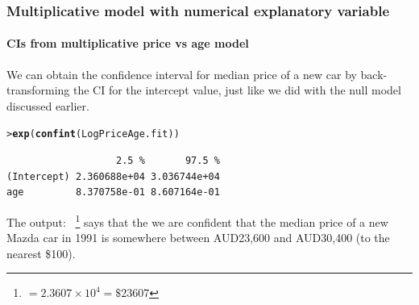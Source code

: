 \documentclass{beamer}\usepackage[]{graphicx}\usepackage[]{xcolor}
\makeatletter
\newcommand{\hlstd}[1]{\textcolor[rgb]{0.345,0.345,0.345}{#1}}%
\newcommand{\hlkwd}[1]{\textcolor[rgb]{0.737,0.353,0.396}{\textbf{#1}}}%
\newenvironment{kframe}{%
 \def\at@end@of@kframe{}%
 \ifinner\ifhmode%
  \def\at@end@of@kframe{\end{minipage}}%
  \begin{minipage}{\columnwidth}%
 \fi\fi%
 \def\FrameCommand##1{\hskip\@totalleftmargin \hskip-\fboxsep
 \colorbox{shadecolor}{##1}\hskip-\fboxsep
     \hskip-\linewidth \hskip-\@totalleftmargin \hskip\columnwidth}%
 \MakeFramed {\advance\hsize-\width
   \@totalleftmargin\z@ \linewidth\hsize
   \@setminipage}}%
 {\par\unskip\endMakeFramed%
 \at@end@of@kframe}
\newenvironment{knitrout}{}{} %
\makeatother
\begin{document}
\begin{frame}[fragile]
\frametitle{Multiplicative model with numerical explanatory variable}
\framesubtitle{CIs from multiplicative price vs age model}
We can obtain the confidence interval for median price of a new car 
by back-transforming the CI for the intercept value, just like we did with the null model discussed earlier.
\bigskip

\begin{knitrout}\scriptsize
{}\color{fgcolor}\begin{kframe}
\begin{alltt}
\hlstd{> }\hlkwd{exp}\hlstd{(}\hlkwd{confint}\hlstd{(LogPriceAge.fit))}
\end{alltt}
\begin{verbatim}
                   2.5 %       97.5 %
(Intercept) 2.360688e+04 3.036744e+04
age         8.370758e-01 8.607164e-01
\end{verbatim}
\end{kframe}
\end{knitrout}
\bigskip
The output:
  ~\footnote{$=\ensuremath{2.3607\times 10^{4}}=\$23607$} says that the we are confident that the median price of a new Mazda car 
in 1991 is somewhere between AUD23,600 and AUD30,400 (to the nearest \$100).
\end{frame}
\end{document}

